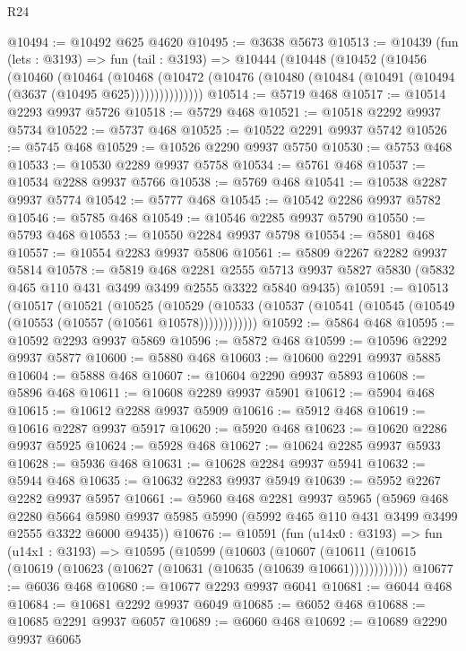 \begin{lexlean}{R24}
\begin{coremodule}
@10494 := @10492 @625 @4620
@10495 := @3638 @5673
@10513 := @10439
    (fun (lets : @3193) =>
    fun (tail : @3193) =>
    @10444
      (@10448
        (@10452
          (@10456
            (@10460
              (@10464
                (@10468
                  (@10472 (@10476 (@10480 (@10484 (@10491 (@10494 (@3637 (@10495 @625)))))))))))))))
@10514 := @5719 @468
@10517 := @10514 @2293 @9937 @5726
@10518 := @5729 @468
@10521 := @10518 @2292 @9937 @5734
@10522 := @5737 @468
@10525 := @10522 @2291 @9937 @5742
@10526 := @5745 @468
@10529 := @10526 @2290 @9937 @5750
@10530 := @5753 @468
@10533 := @10530 @2289 @9937 @5758
@10534 := @5761 @468
@10537 := @10534 @2288 @9937 @5766
@10538 := @5769 @468
@10541 := @10538 @2287 @9937 @5774
@10542 := @5777 @468
@10545 := @10542 @2286 @9937 @5782
@10546 := @5785 @468
@10549 := @10546 @2285 @9937 @5790
@10550 := @5793 @468
@10553 := @10550 @2284 @9937 @5798
@10554 := @5801 @468
@10557 := @10554 @2283 @9937 @5806
@10561 := @5809 @2267 @2282 @9937 @5814
@10578 := @5819
    @468
    @2281
    @2555
    @5713
    @9937
    @5827
    @5830
    (@5832 @465 @110 @431 @3499 @3499 @2555 @3322 @5840 @9435)
@10591 := @10513
    (@10517
      (@10521
        (@10525
          (@10529 (@10533 (@10537 (@10541 (@10545 (@10549 (@10553 (@10557 (@10561 @10578))))))))))))
@10592 := @5864 @468
@10595 := @10592 @2293 @9937 @5869
@10596 := @5872 @468
@10599 := @10596 @2292 @9937 @5877
@10600 := @5880 @468
@10603 := @10600 @2291 @9937 @5885
@10604 := @5888 @468
@10607 := @10604 @2290 @9937 @5893
@10608 := @5896 @468
@10611 := @10608 @2289 @9937 @5901
@10612 := @5904 @468
@10615 := @10612 @2288 @9937 @5909
@10616 := @5912 @468
@10619 := @10616 @2287 @9937 @5917
@10620 := @5920 @468
@10623 := @10620 @2286 @9937 @5925
@10624 := @5928 @468
@10627 := @10624 @2285 @9937 @5933
@10628 := @5936 @468
@10631 := @10628 @2284 @9937 @5941
@10632 := @5944 @468
@10635 := @10632 @2283 @9937 @5949
@10639 := @5952 @2267 @2282 @9937 @5957
@10661 := @5960
    @468
    @2281
    @9937
    @5965
    (@5969
      @468
      @2280
      @5664
      @5980
      @9937
      @5985
      @5990
      (@5992 @465 @110 @431 @3499 @3499 @2555 @3322 @6000 @9435))
@10676 := @10591
    (fun (u14x0 : @3193) =>
    fun (u14x1 : @3193) =>
    @10595
      (@10599
        (@10603
          (@10607 (@10611 (@10615 (@10619 (@10623 (@10627 (@10631 (@10635 (@10639 @10661))))))))))))
@10677 := @6036 @468
@10680 := @10677 @2293 @9937 @6041
@10681 := @6044 @468
@10684 := @10681 @2292 @9937 @6049
@10685 := @6052 @468
@10688 := @10685 @2291 @9937 @6057
@10689 := @6060 @468
@10692 := @10689 @2290 @9937 @6065

\end{coremodule}
\end{lexlean}
